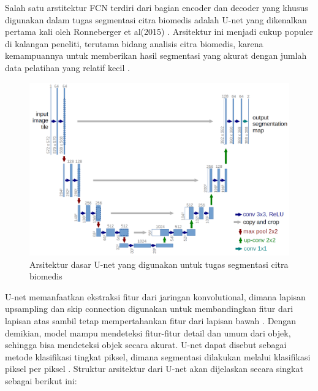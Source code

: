 \noindent Salah satu arstitektur FCN terdiri dari bagian encoder dan decoder yang khusus digunakan dalam tugas segmentasi citra biomedis adalah U-net yang dikenalkan pertama kali oleh Ronneberger et al(2015) \cite{ronneberger_u-net_2015}. Arsitektur ini menjadi cukup populer di kalangan peneliti, terutama bidang analisis citra biomedis, karena kemampuannya untuk memberikan hasil segmentasi yang akurat dengan jumlah data pelatihan yang relatif kecil \cite{williams_unified_2023}.

\begin{figure}[H]
	\centering
	\includegraphics[scale=.2]{gambar/U-net.png}
	\caption{Arsitektur dasar U-net yang digunakan untuk tugas segmentasi citra biomedis}
	\label{fig:U-net}
\end{figure}

\noindent U-net memanfaatkan ekstraksi fitur dari jaringan konvolutional, dimana lapisan upsampling dan skip connection digunakan untuk membandingkan fitur dari lapisan atas sambil tetap mempertahankan fitur dari lapisan bawah \cite{huang_fully_2022}. Dengan demikian, model mampu mendeteksi fitur-fitur detail dan umum dari objek, sehingga bisa mendeteksi objek secara akurat. U-net dapat disebut sebagai metode klasifikasi tingkat piksel, dimana segmentasi dilakukan melalui klasifikasi piksel per piksel \cite{siddique_u-net_2020}. Struktur arsitektur dari U-net akan dijelaskan secara singkat sebagai berikut ini:

